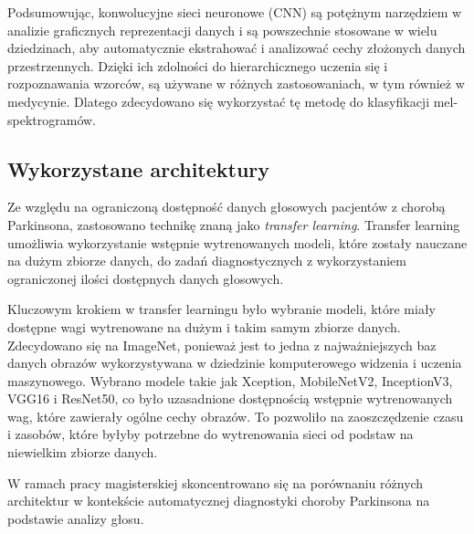 Podsumowując, konwolucyjne sieci neuronowe (CNN) są potężnym narzędziem w analizie graficznych reprezentacji danych i są powszechnie stosowane w wielu dziedzinach, aby automatycznie ekstrahować i analizować cechy złożonych danych przestrzennych.
Dzięki ich zdolności do hierarchicznego uczenia się i rozpoznawania wzorców, są używane w różnych zastosowaniach, w tym również w medycynie.
Dlatego zdecydowano się wykorzystać tę metodę do klasyfikacji mel-spektrogramów.

\subsection{Wykorzystane architektury}
\label{subsec:architektury}

Ze względu na ograniczoną dostępność danych głosowych pacjentów z chorobą Parkinsona, zastosowano technikę znaną jako \emph{transfer learning}.
Transfer learning umożliwia wykorzystanie wstępnie wytrenowanych modeli, które zostały nauczane na dużym zbiorze danych,
do zadań diagnostycznych z wykorzystaniem ograniczonej ilości dostępnych danych głosowych.

Kluczowym krokiem w transfer learningu było wybranie modeli, które miały dostępne wagi wytrenowane na dużym i takim samym zbiorze danych.
Zdecydowano się na ImageNet, ponieważ jest to jedna z najważniejszych baz danych obrazów wykorzystywana w dziedzinie komputerowego widzenia i uczenia maszynowego.
Wybrano modele takie jak Xception, MobileNetV2, InceptionV3, VGG16 i ResNet50, co było uzasadnione dostępnością wstępnie wytrenowanych wag, które zawierały ogólne cechy obrazów.
To pozwoliło na zaoszczędzenie czasu i zasobów, które byłyby potrzebne do wytrenowania sieci od podstaw na niewielkim zbiorze danych.

W ramach pracy magisterskiej skoncentrowano się na porównaniu różnych architektur w kontekście automatycznej diagnostyki choroby Parkinsona na podstawie analizy głosu.

